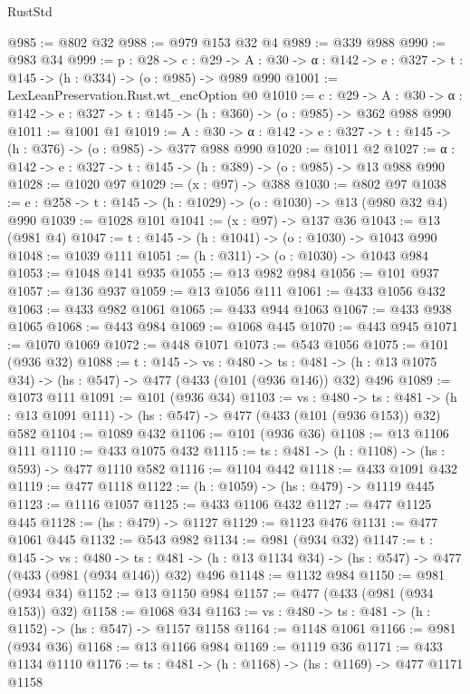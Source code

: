 \begin{lexlean}{RustStd}
\begin{coremodule}
{\begin{coremodule}
{{{{@985 := @802 @32
@988 := @979 @153 @32 @4
@989 := @339 @988
@990 := @983 @34
@999 := {p : @28} ->
  {c : @29} ->
  {A : @30} -> {α : @142} -> {e : @327} -> {t : @145} -> (h : @334) -> (o : @985) -> @989 @990
@1001 := LexLeanPreservation.Rust.wt_encOption @0
@1010 := {c : @29} ->
  {A : @30} -> {α : @142} -> {e : @327} -> {t : @145} -> (h : @360) -> (o : @985) -> @362 @988 @990
@1011 := @1001 @1
@1019 := {A : @30} ->
  {α : @142} -> {e : @327} -> {t : @145} -> (h : @376) -> (o : @985) -> @377 @988 @990
@1020 := @1011 @2
@1027 := {α : @142} -> {e : @327} -> {t : @145} -> (h : @389) -> (o : @985) -> @13 @988 @990
@1028 := @1020 @97
@1029 := (x : @97) -> @388
@1030 := @802 @97
@1038 := {e : @258} -> {t : @145} -> (h : @1029) -> (o : @1030) -> @13 (@980 @32 @4) @990
@1039 := @1028 @101
@1041 := (x : @97) -> @137 @36
@1043 := @13 (@981 @4)
@1047 := {t : @145} -> (h : @1041) -> (o : @1030) -> @1043 @990
@1048 := @1039 @111
@1051 := (h : @311) -> (o : @1030) -> @1043 @984
@1053 := @1048 @141 @935
@1055 := @13 @982 @984
@1056 := @101 @937
@1057 := @136 @937
@1059 := @13 @1056 @111
@1061 := @433 @1056 @432
@1063 := @433 @982 @1061
@1065 := @433 @944 @1063
@1067 := @433 @938 @1065
@1068 := @443 @984
@1069 := @1068 @445
@1070 := @443 @945
@1071 := @1070 @1069
@1072 := @448 @1071
@1073 := @543 @1056
@1075 := @101 (@936 @32)
@1088 := {t : @145} ->
  {vs : @480} ->
  {ts : @481} -> (h : @13 @1075 @34) -> (hs : @547) -> @477 (@433 (@101 (@936 @146)) @32) @496
@1089 := @1073 @111
@1091 := @101 (@936 @34)
@1103 := {vs : @480} ->
  {ts : @481} -> (h : @13 @1091 @111) -> (hs : @547) -> @477 (@433 (@101 (@936 @153)) @32) @582
@1104 := @1089 @432
@1106 := @101 (@936 @36)
@1108 := @13 @1106 @111
@1110 := @433 @1075 @432
@1115 := {ts : @481} -> (h : @1108) -> (hs : @593) -> @477 @1110 @582
@1116 := @1104 @442
@1118 := @433 @1091 @432
@1119 := @477 @1118
@1122 := (h : @1059) -> (hs : @479) -> @1119 @445
@1123 := @1116 @1057
@1125 := @433 @1106 @432
@1127 := @477 @1125 @445
@1128 := (hs : @479) -> @1127
@1129 := @1123 @476
@1131 := @477 @1061 @445
@1132 := @543 @982
@1134 := @981 (@934 @32)
@1147 := {t : @145} ->
  {vs : @480} ->
  {ts : @481} -> (h : @13 @1134 @34) -> (hs : @547) -> @477 (@433 (@981 (@934 @146)) @32) @496
@1148 := @1132 @984
@1150 := @981 (@934 @34)
@1152 := @13 @1150 @984
@1157 := @477 (@433 (@981 (@934 @153)) @32)
@1158 := @1068 @34
@1163 := {vs : @480} -> {ts : @481} -> (h : @1152) -> (hs : @547) -> @1157 @1158
@1164 := @1148 @1061
@1166 := @981 (@934 @36)
@1168 := @13 @1166 @984
@1169 := @1119 @36
@1171 := @433 @1134 @1110
@1176 := {ts : @481} -> (h : @1168) -> (hs : @1169) -> @477 @1171 @1158
}}}}
\end{coremodule}}
\end{coremodule}
\end{lexlean}
